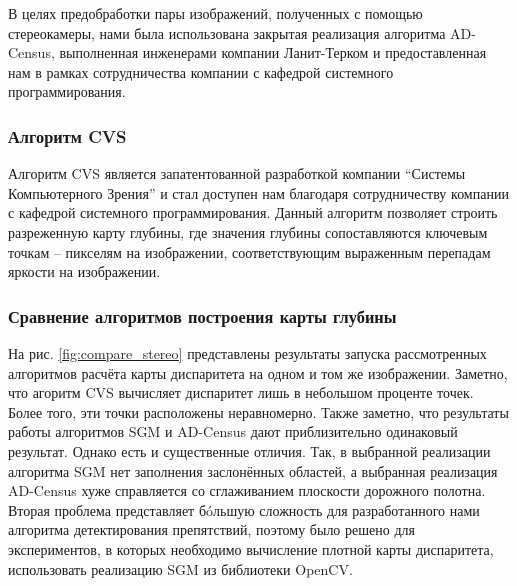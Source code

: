 \documentclass[aps,%
14pt,%
final,%
oneside,
onecolumn,%
musixtex, %
superscriptaddress,%
centertags]{extarticle} %
\begin{document}
В целях предобработки пары изображений, полученных с помощью стереокамеры, нами была использована закрытая реализация алгоритма AD-Census, выполненная инженерами компании Ланит-Терком\cite{tercom} и предоставленная нам в рамках сотрудничества компании с кафедрой системного программирования.


\subsubsection{Алгоритм CVS}
Алгоритм CVS\cite{cvs} является запатентованной разработкой компании ``Системы Компьютерного Зрения''\cite{cvs_webpage} и стал доступен нам благодаря сотрудничеству компании с кафедрой системного программирования. Данный алгоритм позволяет строить разреженную карту глубины, где значения глубины сопоставляются ключевым точкам -- пикселям на изображении, соответствующим выраженным перепадам яркости на изображении.

\subsubsection{Сравнение алгоритмов построения карты глубины}

На рис. \ref{fig:compare_stereo} представлены результаты запуска рассмотренных алгоритмов расчёта карты диспаритета на одном и том же изображении. Заметно, что агоритм CVS вычисляет диспаритет лишь в небольшом проценте точек. Более того, эти точки расположены неравномерно. Также заметно, что результаты работы алгоритмов SGM и AD-Census дают приблизительно одинаковый результат. Однако есть и существенные отличия. Так, в выбранной реализации алгоритма SGM нет заполнения заслонённых областей, а выбранная реализация AD-Census хуже справляется со сглаживанием плоскости дорожного полотна. Вторая проблема представляет б\'oльшую сложность для разработанного нами алгоритма детектирования препятствий, поэтому было решено для экспериментов, в которых необходимо вычисление плотной карты диспаритета, использовать реализацию SGM из библиотеки OpenCV.
\end{document}
